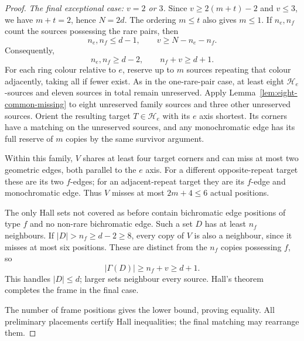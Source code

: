 \begin{proof}
\emph{The final exceptional case: $v=2$ or $3$.} Since
$v\ge2(m+t)-2$ and $v\le3$, we have $m+t=2$, hence $N=2d$.
The ordering $m\le t$ also gives $m\le1$. If $n_e,n_f$
count the sources possessing the rare pairs, then
\[
 n_e,n_f\le d-1,\qquad
 v\ge N-n_e-n_f.
\]
Consequently,
\[
 n_e,n_f\ge d-2,\qquad n_f+v\ge d+1.
\]
For each ring colour relative to $e$, reserve up to $m$ sources repeating
that colour adjacently, taking all if fewer exist. As in the one-rare-pair
case, at least eight $\mathcal H_e$-sources and eleven sources in total
remain unreserved. Apply Lemma~\ref{lem:eight-common-missing} to eight
unreserved family sources and three other unreserved sources. Orient the
resulting target $T\in\mathcal H_e$ with its $e$ axis shortest. Its corners
have a matching on the unreserved sources, and any monochromatic edge has
its full reserve of $m$ copies by the same survivor argument.

Within this family, $V$ shares at least four target corners and can
miss at most two geometric edges, both parallel to the $e$ axis. For
a different opposite-repeat target these are its two $f$-edges; for
an adjacent-repeat target they are its $f$-edge and monochromatic edge.
Thus $V$ misses at most $2m+4\le6$ actual positions.

The only Hall sets not covered as before contain bichromatic edge
positions of type $f$ and no non-rare bichromatic edge. Such a set $D$
has at least $n_f$ neighbours. If $|D|>n_f\ge d-2\ge8$, every copy
of $V$ is also a neighbour, since it misses at most six positions.
These are distinct from the $n_f$ copies possessing $f$, so
\[
 |\Gamma(D)|\ge n_f+v\ge d+1.
\]
This handles $|D|\le d$; larger sets neighbour every source. Hall's
theorem completes the frame in the final case.

The number of frame positions gives the lower bound, proving equality.
All preliminary placements certify Hall inequalities; the final
matching may rearrange them.
\end{proof}

